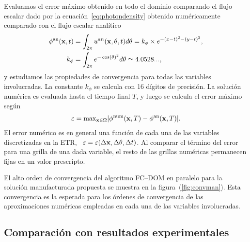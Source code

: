 Evaluamos el error máximo obtenido en todo el dominio 
comparando el flujo escalar dado por la ecuación~\eqref{eq:photondensity} 
obtenido numéricamente comparado con el flujo escalar analítico
\begin{equation*}
\begin{split}
\begin{aligned}
\phi^{\text{an}}(\mathbf{x},t)&=\int_{2\pi} u^{an}(\mathbf{x},\theta,t) d\theta=
k_{\phi}\times e^{-(x-t)^2-(y-t)^2},\\
k_{\phi}&=\int_{2\pi}e^{-\cos(\theta)^2}d\theta\simeq 4.0528...,
\end{aligned}
\end{split}
\label{eq:photondensityan}
\end{equation*}
y estudiamos las propiedades de convergencia 
para todas las variables involucradas. La constante 
$k_{\phi}$ se calcula con 16 dígitos de precisión. 
La solución numérica es evaluada hasta el tiempo final $T$, 
y luego se calcula el error máximo según
\begin{equation*}
\varepsilon=\text{max}_{\mathbf{x} \in \Omega} |\phi^{\text{num}}(\mathbf{x},T) -\phi^{\text{an}}(\mathbf{x},T)|.
\label{eq:maximumerror}
\end{equation*}
El error numérico es en general una función 
de cada una de las variables discretizadas en la ETR, 
\ie~$\varepsilon=\varepsilon(\Delta \mathbf{x}, \Delta \theta, \Delta t)$. 
Al comparar el término del error para una grilla de una dada variable, 
el resto de las grillas numéricas permanecen fijas en un valor prescripto.

El alto orden de convergencia del algoritmo FC--DOM en paralelo 
para la solución manufacturada propuesta se muestra en la figura~(\ref{fig:convman}). 
Esta convergencia es la esperada para 
los órdenes de convergencia de las aproximaciones 
numéricas empleadas 
en cada una de las variables involucradas. 
\pagebreak 
\clearpage
\subsection{Comparación con resultados experimentales}
\label{sec:resexp}

